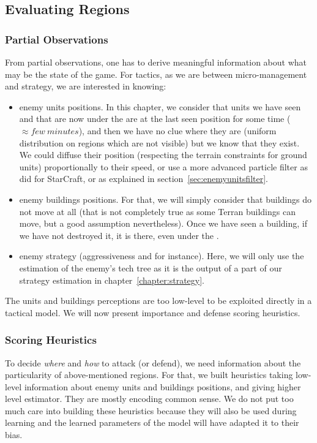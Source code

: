 \subsection{Evaluating Regions}
\subsubsection{Partial Observations}
From partial observations, one has to derive meaningful information about what may be the state of the game. For tactics, as we are between micro-management and strategy, we are interested in knowing:
\begin{itemize}
    \item enemy units positions. In this chapter, we consider that units we have seen and that are now under the  are at the last seen position for some time ($\approx few\ minutes$), and then we have no clue where they are (uniform distribution on regions which are not visible) but we know that they exist. We could diffuse their position (respecting the terrain constraints for ground units) proportionally to their speed, or use a more advanced particle filter as \cite{weber2011aiide} did for StarCraft, or as explained in section~\ref{sec:enemyunitsfilter}.
    \item enemy buildings positions. For that, we will simply consider that buildings do not move at all (that is not completely true as some Terran buildings can move, but a good assumption nevertheless). Once we have seen a building, if we have not destroyed it, it is there, even under the . 
    \item enemy strategy (aggressiveness and  for instance). Here, we will only use the estimation of the enemy's tech tree as it is the output of a part of our strategy estimation in chapter~\ref{chapter:strategy}.
\end{itemize}
The units and buildings perceptions are too low-level to be exploited directly in a tactical model. We will now present importance and defense scoring heuristics.

\subsubsection{Scoring Heuristics}
To decide \textit{where} and \textit{how} to attack (or defend), we need information about the particularity of above-mentioned regions. For that, we built heuristics taking low-level information about enemy units and buildings positions, and giving higher level estimator. They are mostly encoding common sense. We do not put too much care into building these heuristics because they will also be used during learning and the learned parameters of the model will have adapted it to their bias. 

